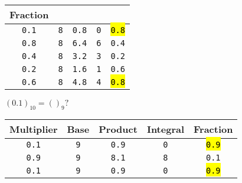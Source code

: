 \documentclass[12pt]{article}
\begin{document}
\begin{minipage}[t]{0.5\textwidth}
\begin{center}
\begin{tabular}{|c|c|c|c|c|}
			\cellcolor{gray!25}Fraction                                                                       \\
			\hline\hline
			\texttt{0.1}                         & \texttt{8} & \texttt{0.8} & \texttt{0} & \hl{\texttt{0.8}} \\\hline
			\texttt{0.8}                         & \texttt{8} & \texttt{6.4} & \texttt{6} & \texttt{0.4}      \\\hline
			\texttt{0.4}                         & \texttt{8} & \texttt{3.2} & \texttt{3} & \texttt{0.2}      \\\hline
			\texttt{0.2}                         & \texttt{8} & \texttt{1.6} & \texttt{1} & \texttt{0.6}      \\\hline
			\texttt{0.6}                         & \texttt{8} & \texttt{4.8} & \texttt{4} & \hl{\texttt{0.8}} \\\hline
		\end{tabular}
	\end{center}
	$(0.1)_{10} = ()_9?$
	\begin{center}
		\begin{tabular}{|c|c|c|c|c|}
			\hline \cellcolor{gray!25}Multiplier &
			\cellcolor{gray!25}Base              &
			\cellcolor{gray!25}Product           &
			\cellcolor{gray!25}Integral          &
			\cellcolor{gray!25}Fraction                                                                       \\
			\hline\hline
			\texttt{0.1}                         & \texttt{9} & \texttt{0.9} & \texttt{0} & \hl{\texttt{0.9}} \\\hline
			\texttt{0.9}                         & \texttt{9} & \texttt{8.1} & \texttt{8} & \texttt{0.1}      \\\hline
			\texttt{0.1}                         & \texttt{9} & \texttt{0.9} & \texttt{0} & \hl{\texttt{0.9}} \\\hline
		\end{tabular}
	\end{center}
\end{minipage}\\
\end{document}
